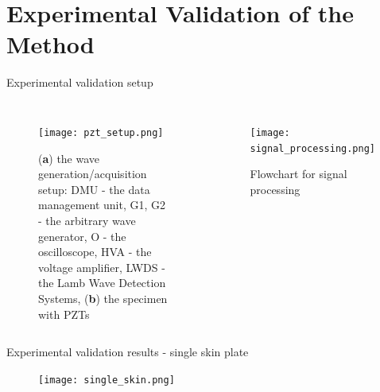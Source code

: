 \documentclass[10pt,aspectratio=169]{beamer} %
\begin{document}
\section{Experimental Validation of the Method }
\begin{frame}[label=frame13]{Experimental validation setup}
	\begin{columns}[T]
	\begin{figure}
		\texttt{[image: pzt\_setup.png]}
		\footnotesize
		\caption{(\textbf{a}) the wave generation/acquisition setup: DMU - the data management unit, G1, G2 - the arbitrary wave generator, O - the oscilloscope, HVA - the voltage amplifier, LWDS - the Lamb Wave Detection Systems, (\textbf{b}) the specimen with PZTs}
		\label{fig:pzt_setup}
	\end{figure}
		\begin{figure}
			\texttt{[image: signal\_processing.png]}
			\caption{Flowchart for signal processing}
			\label{fig:signal_processing}
		\end{figure}
	\end{columns}	
\end{frame}
\begin{frame}[label=frame14]{Experimental validation results - single skin plate}
		\begin{figure}
			\texttt{[image: single\_skin.png]}
			\label{fig:single_skin}
		\end{figure}
\end{frame}
\end{document}
